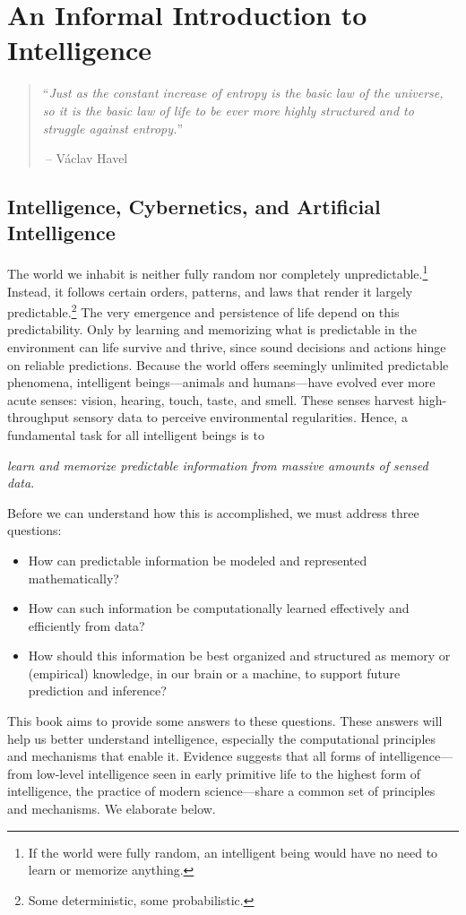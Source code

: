 \documentclass[../../book-main.tex]{subfiles}
\begin{document}
\chapter{An Informal Introduction to Intelligence}
\label{ch:intro}

\begin{quote}
    ``{\em Just as the constant increase of entropy is the basic law
        of the universe, so it is the basic law of life to be ever more
    highly structured and to struggle against entropy.}''

    $~$\hfill -- V\'{a}clav Havel
\end{quote}
\vspace{5mm}

\section{Intelligence, Cybernetics, and Artificial Intelligence}
The world we inhabit is neither fully random nor completely
unpredictable.\footnote{If the world were fully random, an
intelligent being would have no need to learn or memorize anything.}
Instead, it follows certain orders, patterns, and laws that render it
largely predictable.\footnote{Some deterministic, some
probabilistic.} The very emergence and persistence of life depend on
this predictability. Only by learning and memorizing what is
predictable in the environment can life survive and thrive, since
sound decisions and actions hinge on reliable predictions. Because
the world offers seemingly unlimited predictable phenomena,
intelligent beings---animals and humans---have evolved ever more
acute senses: vision, hearing, touch, taste, and smell. These senses
harvest high-throughput sensory data to perceive environmental
regularities. Hence, a fundamental task for all intelligent beings is to
\begin{center}
    \textit{learn and memorize predictable information from massive
    amounts of sensed data}.
\end{center}
Before we can understand how this is accomplished, we must address
three questions:
\begin{itemize}
    \item How can predictable information be modeled and represented
        mathematically?
    \item How can such information be computationally learned
        effectively and efficiently from data?
    \item How should this information be best organized and
        structured as memory or (empirical) knowledge, in our brain
        or a machine, to support future prediction and inference?
\end{itemize}
This book aims to provide some answers to these questions. These
answers will help us better understand intelligence, especially the
computational principles and mechanisms that enable it. Evidence
suggests that all forms of intelligence---from low-level intelligence
seen in early primitive life to the highest form of intelligence, the
practice of modern science---share a common set of principles and
mechanisms. We elaborate below.
\end{document}
